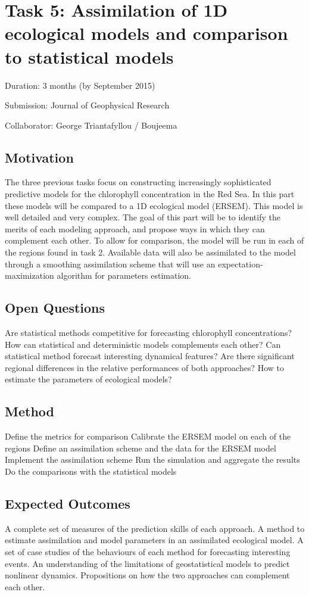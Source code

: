 
\section{Task 5: Assimilation of 1D ecological models and comparison to statistical models}

Duration: 3 months (by September 2015)

Submission: Journal of Geophysical Research 

Collaborator: George Triantafyllou / Boujeema

\subsection{Motivation}

The three previous tasks focus on constructing increasingly sophisticated predictive models for the chlorophyll concentration in the Red Sea. In this part these models will be compared to a 1D ecological model (ERSEM). This model is well detailed and very complex. The goal of this part will be to identify the merits of each modeling approach, and propose ways in which they can complement each other. To allow for comparison, the model will be run in each of the regions found in task 2. Available data will also be assimilated to the model through a smoothing assimilation scheme that will use an expectation-maximization algorithm for parameters estimation. 

\subsection{Open Questions}

Are statistical methods competitive for forecasting chlorophyll concentrations?
How can statistical and deterministic models complements each other?
Can statistical method forecast interesting dynamical features?
Are there significant regional differences in the relative performances of both approaches?
How to estimate the parameters of ecological models? 

\subsection{Method}

Define the metrics for comparison
Calibrate the ERSEM model on each of the regions
Define an assimilation scheme and the data for the ERSEM model
Implement the assimilation scheme
Run the simulation and aggregate the results
Do the comparisons with the statistical models

\subsection{Expected Outcomes}

A complete set of measures of the prediction skills of each approach.
A method to estimate assimilation and model parameters in an assimilated ecological model.
A set of case studies of the behaviours of each method for forecasting interesting events.
An understanding of the limitations of geostatistical models to predict nonlinear dynamics. 
Propositions on how the two approaches can complement each other.
